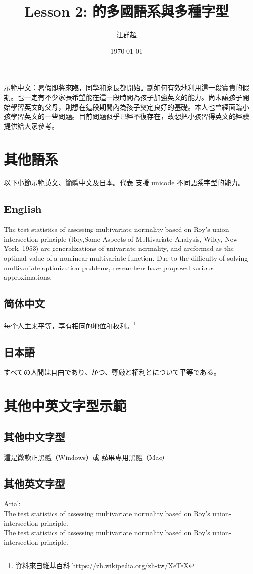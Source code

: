 \documentclass[12pt, a4paper]{article}
\title{ Lesson 2: \XeLaTeX 的多國語系與多種字型}
\author{汪群超}
\date{\today }
\begin{document}
\maketitle
\fontsize{12}{22pt}\selectfont %

示範中文：暑假即將來臨，同學和家長都開始計劃如何有效地利用這一段寶貴的假期。也一定有不少家長希望能在這一段時間為孩子加強英文的能力。尚未讓孩子開始學習英文的父母，則想在這段期間內為孩子奠定良好的基礎。本人也曾經面臨小孩學習英文的一些問題。目前問題似乎已經不復存在，故想把小孩習得英文的經驗提供給大家參考。

\section{其他語系}
以下小節示範英文、簡體中文及日本。代表 \XeTeX 支援 unicode 不同語系字型的能力。
\subsection{English}
The test statistics of assessing multivariate normality based on Roy's union-intersection principle (Roy,Some Aspects of Multivariate Analysis, Wiley, New York, 1953) are generalizations of univariate normality, and areformed as the optimal value of a nonlinear multivariate function. Due to the difficulty of solving multivariate optimization problems, researchers have proposed various approximations.

\subsection{简体中文}
每个人生来平等，享有相同的地位和权利。\footnote{資料來自維基百科 https://zh.wikipedia.org/zh-tw/XeTeX}

\subsection{日本語}
すべての人間は自由であり、かつ、尊厳と権利とについて平等である。

\section{其他中英文字型示範}
\subsection{其他中文字型}
{\MB 這是微軟正黑體（Windows）或 蘋果專用黑體（Mac）}

\subsection{其他英文字型}
{\A Arial:}\\
{\A The test statistics of assessing multivariate normality based on Roy's union-intersection principle.}\\

{\T The test statistics of assessing multivariate normality based on Roy's union-intersection principle.}
\end{document}
